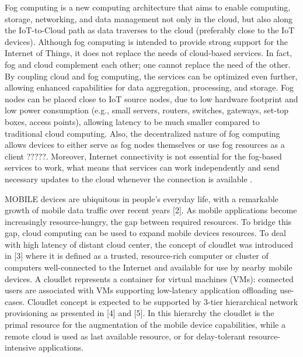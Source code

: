 \noindent\tab Fog computing is a new computing architecture that aims to enable computing, storage, networking, and data management not only in the cloud, but also along the IoT-to-Cloud path as data traverses to the cloud (preferably close to the IoT devices).
Although fog computing is intended to provide strong support for the Internet of Things, it does not replace the needs of cloud-based services. In fact, fog and cloud complement each other; one cannot replace the need of the other. By coupling cloud and fog computing, the services can be optimized even further, allowing enhanced capabilities for data aggregation, processing, and storage. Fog nodes can be placed close to IoT source nodes, due to low hardware footprint and low power consumption (e.g., small servers, routers, switches, gateways, set-top boxes, access points), allowing latency to be much smaller compared to traditional cloud computing. Also, the decentralized nature of fog computing allows devices to either serve as fog nodes themselves or use fog resources as a client ?????. Moreover, Internet connectivity is not essential for the fog-based services to work, what means that services can work independently and send necessary updates to the cloud whenever the connection is available \cite{yousefpour2018all}.


MOBILE devices are ubiquitous in people’s everyday
life, with a remarkable growth of mobile data traffic
over recent years [2]. As mobile applications become increasingly
resource-hungry, the gap between required resources.
To bridge this gap, cloud computing can be used to expand
mobile devices resources. To deal with high latency of distant
cloud center, the concept of cloudlet was introduced in [3]
where it is defined as a trusted, resource-rich computer or
cluster of computers well-connected to the Internet and available
for use by nearby mobile devices. A cloudlet represents
a container for virtual machines (VMs): connected users
are associated with VMs supporting low-latency application
offloading use-cases.
Cloudlet concept is expected to be supported by 3-tier
hierarchical network provisioning as presented in [4] and [5].
In this hierarchy the cloudlet is the primal resource for the
augmentation of the mobile device capabilities, while a remote
cloud is used as last available resource, or for delay-tolerant
resource-intensive applications.

